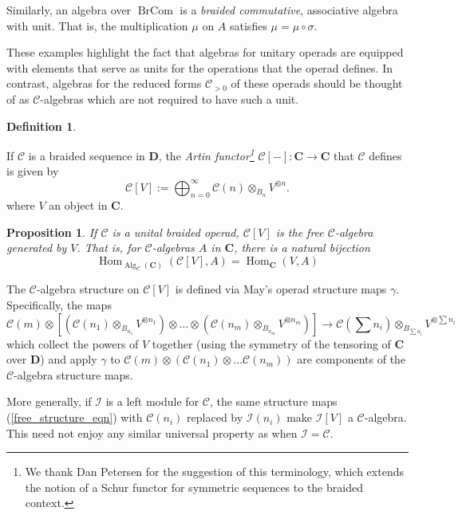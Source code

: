 \documentclass[12pt]{article}
\DeclareMathOperator{\Alg}{Alg}
\DeclareMathOperator{\Hom}{Hom}
\DeclareMathOperator{\BrCom}{BrCom}
\newcommand{\CC} {\mathcal{C}}
\newcommand{\bC} {\mathbf{C}}
\newcommand{\bD} {\mathbf{D}}
\newcommand{\II}{\mathcal{I}}
\newcommand{\beqn}{\begin{equation}}
\newcommand{\eeqn}{\end{equation}}
\theoremstyle{plain}
\newtheorem{prop}[thm]{Proposition}
\theoremstyle{definition}
\newtheorem{defn}[thm]{Definition}
\theoremstyle{remark}
\begin{document}
Similarly, an algebra over $\BrCom$ is a \emph{braided commutative}, associative algebra with unit.  That is, the multiplication $\mu$ on $A$ satisfies $\mu = \mu \circ \sigma$.

These examples highlight the fact that algebras for unitary operads are equipped with elements that serve as units for the operations that the operad defines.  In contrast, algebras for the reduced forms $\CC_{>0}$ of these operads should be thought of as $\CC$-algebras which are not required to have such a unit.

\begin{defn} \label{free_obj_defn}

If $\CC$ is a braided sequence in $\bD$, the \emph{Artin functor\footnote{We thank Dan Petersen for the suggestion of this terminology, which extends the notion of a Schur functor for symmetric sequences to the braided context.}} $\CC[-]: \bC \to \bC$ that $\CC$ defines is given by 
%
\beqn \CC [V] := \bigoplus_{n=0}^\infty \CC(n) \otimes_{B_n} V^{\otimes n}. \label{free_obj_eqn} \eeqn
%
where $V$ an object in $\bC$.

\end{defn}

\begin{prop}

If $\CC$ is a unital braided operad, $\CC[V]$ is the free $\CC$-algebra generated by $V$.  That is, for $\CC$-algebras $A$ in $\bC$, there is a natural bijection
%
$$\Hom_{\Alg_{\CC}(\bC)}(\CC[V], A) = \Hom_{\bC}(V, A)$$

\end{prop}

The $\CC$-algebra structure on $\CC[V]$ is defined via May's operad structure maps $\gamma$. Specifically, the maps 
%
\beqn \CC(m) \otimes [(\CC(n_1) \otimes_{B_{n_1}} V^{\otimes n_1}) \otimes \dots \otimes (\CC(n_m) \otimes_{B_{n_m}} V^{\otimes n_m})] \to \CC(\textstyle{\sum} n_i) \otimes_{B_{\sum n_i}} V^{\otimes \sum n_i} \label{free_structure_eqn} \eeqn
%
which collect the powers of $V$ together (using the symmetry of the tensoring of $\bC$ over $\bD$) and apply $\gamma$ to $\CC(m) \otimes (\CC(n_1) \otimes \dots \CC(n_m))$ are components of the $\CC$-algebra structure maps.

More generally, if $\II$ is a left module for $\CC$, the same structure maps (\ref{free_structure_eqn}) with $\CC(n_i)$ replaced by $\II(n_i)$ make $\II[V]$ a $\CC$-algebra.  This need not enjoy any similar universal property as when $\II = \CC$.
\end{document}
